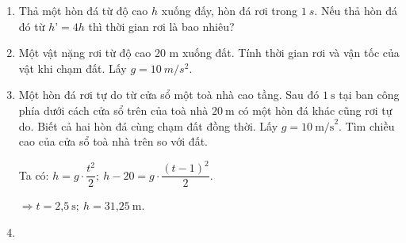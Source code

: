 \begin{enumerate}[label=\bfseries Bài \arabic*:]
	\item {}
	{
		
		Thả một hòn đá từ độ cao $h$ xuống đấy, hòn đá rơi trong $\SI{1}{s}$. Nếu thả hòn đá đó từ $h’ = 4h$ thì thời gian rơi là bao nhiêu?
	}
	
	\item {}
	
	{Một vật nặng rơi từ độ cao 20 m xuống đất. Tính thời gian rơi và vận tốc của vật khi chạm đất. Lấy $g=\SI{10}{m/s^2}$.}
	\item {}
	
	
	{
		Một hòn đá rơi tự do từ cửa sổ một toà nhà cao tầng. Sau đó $1\ \text{s}$ tại ban công phía dưới cách cửa sổ trên của toà nhà $20\ \text{m}$ có một hòn đá khác cũng rơi tự do. Biết cả hai hòn đá cùng chạm đất đồng thời. Lấy $g=10\ \text{m/s}^2$. Tìm chiều cao của cửa sổ toà nhà trên so với đất.	
	}
	\hideall
	{	
		
		Ta có: $h=g\cdot \dfrac{t^2}{2}; \ h-20=g\cdot \dfrac{\left(t-1 \right)^2 }{2}$.
		
		$\Rightarrow t=\text{2,5}\ \text{s}; \ h=\text{31,25}\ \text{m}$.  
	}
	\item {}
	

\end{enumerate}
